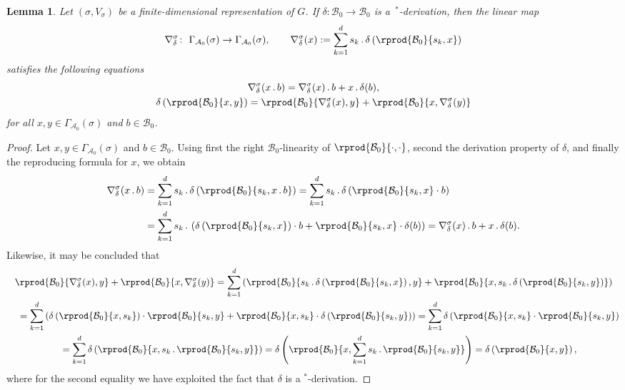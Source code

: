 \documentclass[pdftex]{sigma}
\numberwithin{equation}{section}
\newtheorem{Lemma}[Theorem]{Lemma}
\newcommand*{\Star}{$^*$\nobreakdash}
\newcommand*{\acts}{\,.\,}
\newcommand*{\alg}{\mathcal}		%
\newcommand*{\aA}{\alg{A}}			%
\newcommand*{\aB}{\alg{B}} 			%
\begin{document}
\begin{Lemma}\label{lem:conn}
	Let $(\sigma,V_\sigma)$ be a finite-dimensional representation of $G$.
	If $\delta \colon \aB_0 \to \aB_0$ is a~\Star-de\-ri\-va\-tion, then the linear map
	\begin{gather*}
			\nabla_\delta^\sigma \colon \ \Gamma_{\aA_0}(\sigma) \to \Gamma_{\aA_0}(\sigma), \qquad \nabla_\delta^\sigma(x) := \sum_{k=1}^d s_k \acts \delta \left( \rprod{\aB_0}{s_k,x} \right)
	\end{gather*}
satisfies the following equations
	\begin{gather}
		\label{eq:Leibniz}
		\nabla_\delta^\sigma(x \acts b) = \nabla_\delta^\sigma(x) \acts b + x \acts \delta(b),
		\\
		\label{eq:commutator}
		\delta \left( \rprod{\aB_0}{x,y} \right) = \rprod{\aB_0}{\nabla_\delta^\sigma(x),y} + \rprod{\aB_0}{x,\nabla_\delta^\sigma(y)}
	\end{gather}
for all $x,y \in \Gamma_{\aA_0}(\sigma)$ and $b\in \aB_0$.
\end{Lemma}
\begin{proof}
	Let $x,y \in \Gamma_{\aA_0}(\sigma)$ and $b\in \aB_0$.
	Using first the right $\aB_0$-linearity of $\rprod{\aB_0}{\cdot,\cdot}$, second the derivation property of $\delta$, and finally the reproducing formula for $x$, we obtain
	\begin{align*}
		\nabla_\delta^\sigma(x \acts b)
		&=
		\sum_{k=1}^d s_k \acts \delta \left( \rprod{\aB_0}{s_k,x \acts b} \right)
		=
		\sum_{k=1}^d s_k \acts \delta \left( \rprod{\aB_0}{s_k,x} \cdot b \right)
		\\
		&= \sum_{k=1}^d s_k \acts \left( \delta \left( \rprod{\aB_0}{s_k,x} \right) \cdot b
		+
		\rprod{\aB_0}{s_k,x} \cdot \delta(b) \right)
		=
		\nabla_\delta^\sigma(x) \acts b + x \acts \delta(b).
	\end{align*}
	Likewise, it may be concluded that
	\begin{gather*}
		\rprod{\aB_0}{\nabla_\delta^\sigma(x),y}
		+
		\rprod{\aB_0}{x,\nabla_\delta^\sigma(y)}
		=
		\sum_{k=1}^d \left( \rprod{\aB_0}{s_k \acts \delta \left( \rprod{\aB_0}{s_k,x} \right),y}
		+
		\rprod{\aB_0}{x,s_k \acts \delta \left( \rprod{\aB_0}{s_k,y} \right)} \right)
		\\
		\quad{} =
		 \sum_{k=1}^d \left( \delta \left( \rprod{\aB_0}{x,s_k} \right) \cdot \rprod{\aB_0}{s_k,y}
		 + \rprod{\aB_0}{x,s_k} \cdot \delta \left( \rprod{\aB_0}{s_k,y} \right) \right)
		 =
		 \sum_{k=1}^d \delta \left( \rprod{\aB_0}{x,s_k} \cdot \rprod{\aB_0}{s_k,y} \right)
		 \\
		 \quad{} = \sum_{k=1}^d \delta \left( \rprod{\aB_0}{x,s_k \acts \rprod{\aB_0}{s_k,y}} \right)
		 =
		 \delta \left( \rprod{\aB_0}{x, \sum_{k=1}^d s_k \acts \rprod{\aB_0}{s_k,y}} \right)
		 =
		 \delta \left( \rprod{\aB_0}{x,y} \right),
	\end{gather*}
	where for the second equality we have exploited the fact that $\delta$ is a \Star-derivation.
\end{proof}
\end{document}
